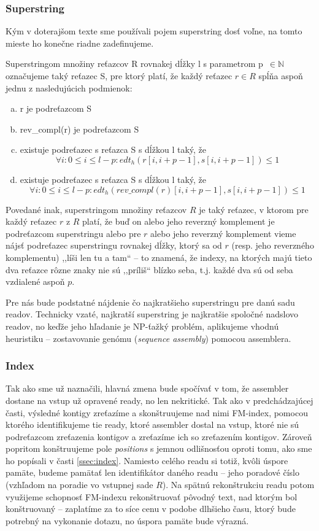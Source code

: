 \subsubsection{Superstring}
Kým v doterajšom texte sme používali pojem superstring dosť voľne, na tomto mieste ho konečne riadne zadefinujeme.
\begin{defn}
\label{def:superstring}
Superstringom množiny reťazcov R rovnakej dĺžky l s parametrom p~$\in \mathbb{N}$ označujeme taký reťazec S, pre ktorý platí, že každý reťazec $r \in R$ spĺňa aspoň jednu z nasledujúcich podmienok:
    \begin{enumerate}[(a)]
    \item r je podreťazcom S
    \item rev\_compl(r) je podreťazcom S
    \item existuje podreťazec s reťazca S s dĺžkou l taký, že 
    $$
    \forall i : 0 \leq i \leq l - p : edt_h(r[i, i+p-1], s[i, i+p-1]) \leq 1
    $$
    \item existuje podreťazec s reťazca S s dĺžkou l taký, že 
    $$
    \forall i : 0 \leq i \leq l - p : edt_h(rev\_compl(r)[i, i+p-1], s[i, i+p-1]) \leq 1
    $$    
    \end{enumerate}
\end{defn}

Povedané inak, superstringom množiny reťazcov $R$ je taký reťazec, v ktorom pre každý reťazec $r$ z $R$ platí, že buď on alebo jeho reverzný komplement je podreťazcom superstringu alebo pre $r$ alebo jeho reverzný komplement vieme nájsť podreťazec superstringu rovnakej dĺžky, ktorý sa od $r$ (resp. jeho reverzného komplementu) ,,líši len tu a tam`` -- to znamená, že indexy, na ktorých majú tieto dva reťazce rôzne znaky nie sú ,,príliš`` blízko seba, t.j. každé dva sú od seba vzdialené aspoň $p$.

Pre nás bude podstatné nájdenie čo najkratšieho superstringu pre danú sadu readov. Technicky vzaté, najkratší superstring je najkratšie spoločné nadslovo readov, no keďže jeho hľadanie je NP-ťažký problém, aplikujeme vhodnú heuristiku -- zostavovanie genómu (\emph{sequence assembly}) pomocou assemblera.

\subsubsection{Index}
Tak ako sme už naznačili, hlavná zmena bude spočívať v tom, že assembler dostane na vstup už opravené ready, no len nekritické. Tak ako v predchádzajúcej časti, výsledné kontigy zreťazíme a skonštruujeme nad nimi FM-index, pomocou ktorého identifikujeme tie ready, ktoré assembler dostal na vstup, ktoré nie sú podreťazcom zreťazenia kontigov a zreťazíme ich so zreťazením kontigov. Zároveň popritom konštruujeme pole \emph{positions} s jemnou odlišnosťou oproti tomu, ako sme ho popísali v časti \ref{ssec:index}. Namiesto celého readu si totiž, kvôli úspore pamäte, budeme pamätať len identifikátor daného readu -- jeho poradové číslo (vzhľadom na poradie vo vstupnej sade $R$). Na spätnú rekonštrukciu readu potom využijeme schopnosť FM-indexu rekonštruovať pôvodný text, nad ktorým bol konštruovaný -- zaplatíme za to síce cenu v podobe dlhšieho času, ktorý bude potrebný na vykonanie dotazu, no úspora pamäte bude výrazná.

